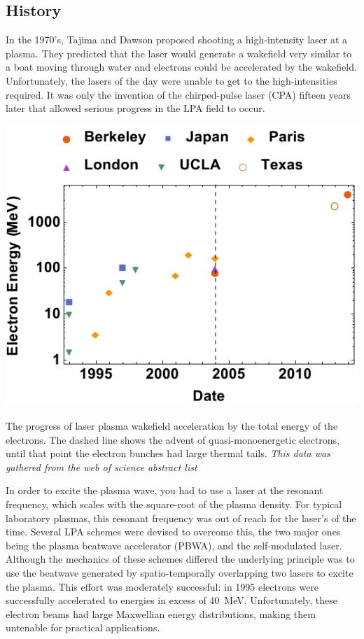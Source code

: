 \documentclass[12pt,letter]{article}
\begin{document}
 \subsection{History}
 In the 1970's, Tajima and Dawson proposed shooting a high-intensity laser at a
 plasma\cite{PhysRevLett.43.267}. They predicted that the laser would generate a wakefield very similar to a boat moving
 through water and electrons could be accelerated by the wakefield.
  Unfortunately, the lasers of the day were unable to get
 to the high-intensities required. It was only the invention of the
 chirped-pulse laser (CPA) fifteen years later that allowed serious progress in
 the LPA field to occur\cite{backus1998high}.
\begin{marginfigure}
	\includegraphics[width=\marginparwidth]{../figures/datfig.pdf}
    \caption{\label{fig:progress}The progress of laser plasma wakefield acceleration by the total
    energy of the electrons. The dashed line shows the advent of
    quasi-monoenergetic electrons, until that point the electron bunches had
    large thermal tails. \em This data was gathered from the web of science
abstract list}
\end{marginfigure}
In order to excite the plasma wave, you had to use a laser at the resonant
frequency, which scales with the square-root of the plasma density. For typical
laboratory plasmas, this resonant frequency was out of reach for the laser's of
the time. Several LPA schemes were devised to overcome
this, the two major ones being the plasma beatwave accelerator (PBWA), and the
self-modulated laser. Although the mechanics of these schemes differed the
underlying principle was to use the beatwave generated by spatio-temporally
overlapping two lasers to excite the plasma. This effort was moderately
successful: in 1995 electrons were successfully accelerated to energies in excess
of \SI{40}{\mega\electronvolt}. Unfortunately, these electron beams had large
Maxwellian energy distributions, making them untenable for practical
applications.
\end{document}
